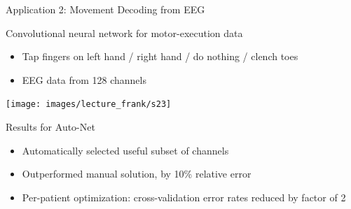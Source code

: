 \begin{frame}[c]{Application 2: Movement Decoding from EEG}
\vspace*{-1.25cm}
\begin{itemize}
	\begin{minipage}{0.45\textwidth}
		\item Convolutional neural network
		for motor-execution data
		\begin{itemize}
			\item Tap fingers on left hand /
			right hand / do nothing /
			clench toes
			\item EEG data from 128 channels
		\end{itemize}
	\end{minipage}
	\begin{minipage}{0.45\textwidth}
		{\hspace*{2cm}
			\texttt{[image: images/lecture\_frank/s23]}
		}
	\end{minipage}
	\item Results for Auto-Net
	\begin{itemize}
		\item Automatically selected useful subset of channels
		\item \alert{Outperformed manual solution}, by 10\% relative error
		\item Per-patient optimization:
		cross-validation \alert{error rates reduced by factor of 2}
	\end{itemize}
\end{itemize}
\end{frame}
